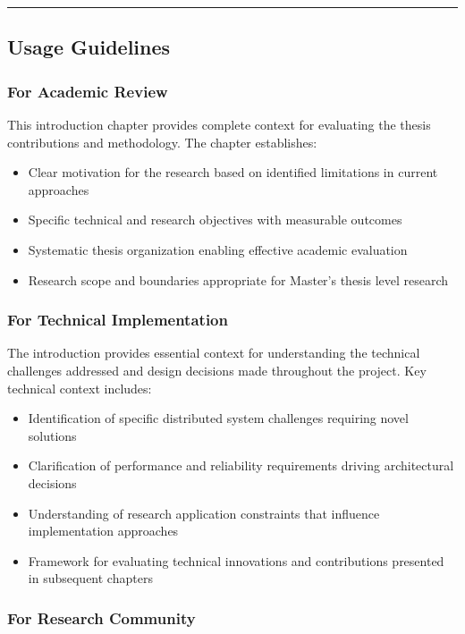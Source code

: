 \documentclass[11pt,a4paper]{article}
\begin{document}
\hrule

\subsection{Usage Guidelines}

\subsubsection{For Academic Review}

This introduction chapter provides complete context for evaluating the thesis
contributions and methodology.  The
chapter establishes:

\begin{itemize}
\item Clear motivation for the research based on identified limitations in current approaches
\item Specific technical and research objectives with measurable outcomes
\item Systematic thesis organization enabling effective academic evaluation
\item Research scope and boundaries appropriate for Master's thesis level research

\end{itemize}
\subsubsection{For Technical Implementation}

The introduction provides essential context for understanding the technical
challenges addressed and design decisions
made throughout the project. Key technical context includes:

\begin{itemize}
\item Identification of specific distributed system challenges requiring novel solutions
\item Clarification of performance and reliability requirements driving architectural decisions
\item Understanding of research application constraints that influence implementation approaches
\item Framework for evaluating technical innovations and contributions presented in subsequent chapters

\end{itemize}
\subsubsection{For Research Community}
\end{document}

